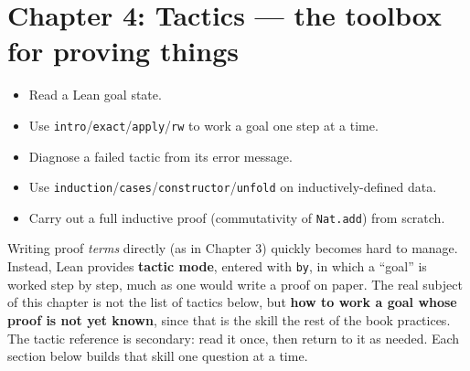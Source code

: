 \chapter{Chapter 4: Tactics --- the toolbox for proving things}\label{sec:04-tactics:00-index:1}

\begin{learningobjectives}
\begin{itemize}
\tightlist
\item
  Read a Lean goal state.
\item
  Use \texttt{intro}/\texttt{exact}/\texttt{apply}/\texttt{rw} to work a goal one step at a time.
\item
  Diagnose a failed tactic from its error message.
\item
  Use \texttt{induction}/\texttt{cases}/\texttt{constructor}/\texttt{unfold} on inductively-defined data.
\item
  Carry out a full inductive proof (commutativity of \texttt{Nat.add}) from scratch.
\end{itemize}
\end{learningobjectives}


Writing proof \emph{terms} directly (as in Chapter 3) quickly becomes hard to manage. Instead, Lean provides \textbf{tactic mode}, entered with \texttt{by}, in which a ``goal'' is worked step by step, much as one would write a proof on paper. The real subject of this chapter is not the list of tactics below, but \textbf{how to work a goal whose proof is not yet known}, since that is the skill the rest of the book practices. The tactic reference is secondary: read it once, then return to it as needed. Each section below builds that skill one question at a time.


